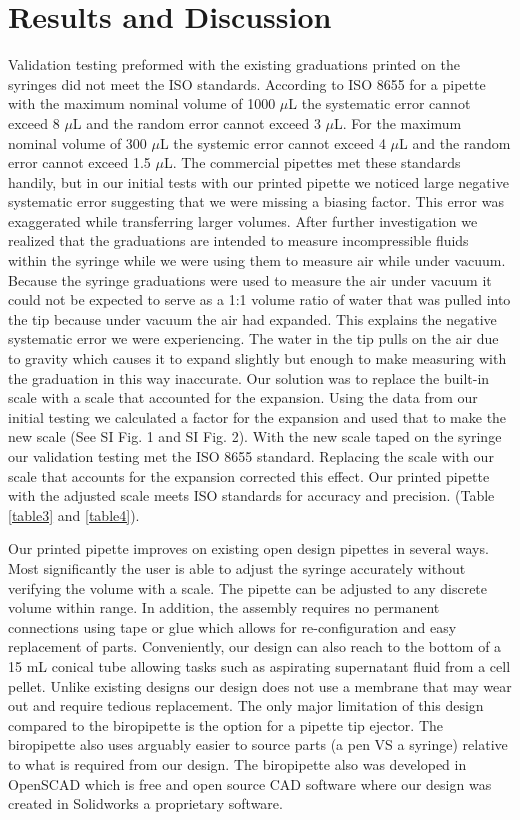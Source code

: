 \documentclass{naturegraphicx}
\begin{document}
\section*{Results and Discussion}
Validation testing preformed with the existing graduations printed on the syringes did not meet the ISO standards.
According to ISO 8655 for a pipette with the maximum nominal volume of 1000 $\mu$L the systematic error cannot exceed 8 $\mu$L and the random error cannot exceed 3 $\mu$L.
For the maximum nominal volume of 300 $\mu$L the systemic error cannot exceed 4 $\mu$L and the random error cannot exceed 1.5 $\mu$L.
The commercial pipettes met these standards handily, but in our initial tests with our printed pipette we noticed large negative systematic error suggesting that we were missing a biasing factor. 
This error was exaggerated while transferring larger volumes.
After further investigation we realized that the graduations are intended to measure incompressible fluids within the syringe while we were using them to measure air while under vacuum.
Because the syringe graduations were used to measure the air under vacuum it could not be expected to serve as a 1:1 volume ratio of water that was pulled into the tip because under vacuum the air had expanded.
This explains the negative systematic error we were experiencing.
The water in the tip pulls on the air due to gravity which causes it to expand slightly but enough to make measuring with the graduation in this way inaccurate.
Our solution was to replace the built-in scale with a scale that accounted for the expansion.
Using the data from our initial testing we calculated a factor for the expansion and used that to make the new scale (See SI Fig. 1 and SI Fig. 2). %
With the new scale taped on the syringe our validation testing met the ISO 8655 standard.
Replacing the scale with our scale that accounts for the expansion corrected this effect. 
Our printed pipette with the adjusted scale meets ISO standards for accuracy and precision. (Table \ref{table3} and \ref{table4}).

Our printed pipette improves on existing open design pipettes in several ways. 
Most significantly the user is able to adjust the syringe accurately without verifying the volume with a scale.
The pipette can be adjusted to any discrete volume within range.
In addition, the assembly requires no permanent connections using tape or glue which allows for re-configuration and easy replacement of parts.
Conveniently, our design can also reach to the bottom of a 15 mL conical tube allowing tasks such as aspirating supernatant fluid from a cell pellet.
Unlike existing designs our design does not use a membrane that may wear out and require tedious replacement.
The only major limitation of this design compared to the biropipette is the option for a pipette tip ejector.
The biropipette also uses arguably easier to source parts (a pen VS a syringe) relative to what is required from our design.
The biropipette also was developed in OpenSCAD which is free and open source CAD software where our design was created in Solidworks a proprietary software. 
\end{document}
